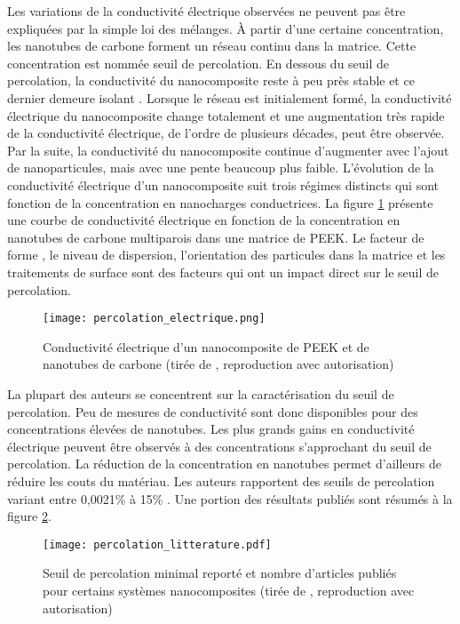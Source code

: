 Les variations de la conductivité électrique observées ne peuvent pas être expliquées par la simple loi des mélanges. 
À partir d'une certaine concentration, les nanotubes de carbone forment un réseau continu dans la matrice. 
Cette concentration est nommée seuil de percolation.
En dessous du seuil de percolation, la conductivité du nanocomposite reste à peu près stable et ce dernier demeure isolant \cite{Bangarusampath2009}. 
Lorsque le réseau est initialement formé, la conductivité électrique du nanocomposite change totalement et une augmentation très rapide de la conductivité électrique, de l'ordre de plusieurs décades, peut être observée. 
Par la suite, la conductivité du nanocomposite continue d'augmenter avec l'ajout de nanoparticules, mais avec une pente beaucoup plus faible. 
L'évolution de la conductivité électrique d'un nanocomposite suit trois régimes distincts qui sont fonction de la concentration en nanocharges conductrices. 
La figure \ref{fig:percolation_electrique} présente une courbe de conductivité électrique en fonction de la concentration en nanotubes de carbone multiparois dans une matrice de PEEK. 
Le facteur de forme \cite{Hu2008}, le niveau de dispersion, l'orientation des particules dans la matrice \cite{Xie2011c} et les traitements de surface sont des facteurs qui ont un impact direct sur le seuil de percolation. 

\begin{figure}[h]
	\centering
	\texttt{[image: percolation\_electrique.png]}
	\caption{Conductivité électrique d'un nanocomposite de PEEK et de nanotubes de carbone (tirée de \cite{Bangarusampath2009}, reproduction avec autorisation)}
	\label{fig:percolation_electrique}
\end{figure}

La plupart des auteurs se concentrent sur la caractérisation du seuil de percolation.
Peu de mesures de conductivité sont donc disponibles pour des concentrations élevées de nanotubes. 
Les plus grands gains en conductivité électrique peuvent être observés à des concentrations s'approchant du seuil de percolation.
La réduction de la concentration en nanotubes permet d'ailleurs de réduire les couts du matériau. 
Les auteurs rapportent des seuils de percolation variant entre 0,0021\% à 15\% \cite{Bauhofer2009}. 
Une portion des résultats publiés sont résumés à la figure \ref{fig:percolation_articles}. 

\begin{figure}[h]
	\centering
	\texttt{[image: percolation\_litterature.pdf]}
	\caption{Seuil de percolation minimal reporté et nombre d'articles publiés pour certains systèmes nanocomposites (tirée de \cite{Bauhofer2009}, reproduction avec autorisation)}
	\label{fig:percolation_articles}
\end{figure}

